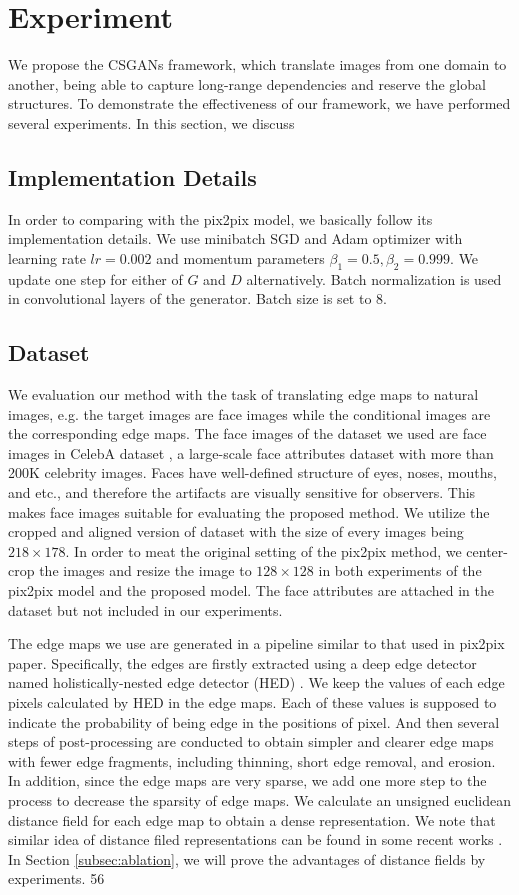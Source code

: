 \section{Experiment}
\label{sec:experiment}
We propose the CSGANs framework, which translate images from one domain to another, being able to capture long-range dependencies and reserve the global structures. To demonstrate the effectiveness of our framework, we have performed several experiments. In this section, we discuss 
\subsection{Implementation Details}
In order to comparing with the pix2pix model, we basically follow its implementation details. We use minibatch SGD and Adam \cite{Adam} optimizer with learning rate $lr=0.002$ and momentum parameters $\beta_1=0.5, \beta_2=0.999$. We update one step for either of $G$ and $D$ alternatively. Batch normalization is used in convolutional layers of the generator. Batch size is set to 8.
\subsection{Dataset}
We evaluation our method with the task of translating edge maps to natural images, e.g. the target images are face images while the conditional images are the corresponding edge maps. The face images of the dataset we used are face images in CelebA dataset \cite{CelebA}, a large-scale face attributes dataset with more than 200K celebrity images. Faces have well-defined structure of eyes, noses, mouths, and etc., and therefore the artifacts are visually sensitive for observers. This makes face images suitable for evaluating the proposed method.  We utilize the cropped and aligned version of dataset with the size of every images being $218\times 178$. In order to meat the original setting of the pix2pix method, we center-crop the images and resize the image to $128\times 128$ in both experiments of the pix2pix model and the proposed model. The face attributes are attached in the dataset but not included in our experiments. 

The edge maps we use are generated in a pipeline similar to that used in pix2pix paper. Specifically, the edges are firstly extracted using a deep edge detector named holistically-nested edge detector (HED) \cite{HED}. We keep the values of each edge pixels calculated by HED in the edge maps. Each of these values is supposed to indicate the probability of being edge in the positions of pixel. And then several steps of post-processing are conducted to obtain simpler and clearer edge maps with fewer edge fragments, including thinning, short edge removal, and erosion. In addition, since the edge maps are very sparse, we add one more step to the process to decrease the sparsity of edge maps. We calculate an unsigned euclidean distance field for each edge map to obtain a dense representation. We note that similar idea of distance filed representations can be found in some recent works \cite{repair_3d, shape_completion, SketchyGANs}. In Section \ref{subsec:ablation}, we will prove the advantages of distance fields by experiments.
56
%
%
